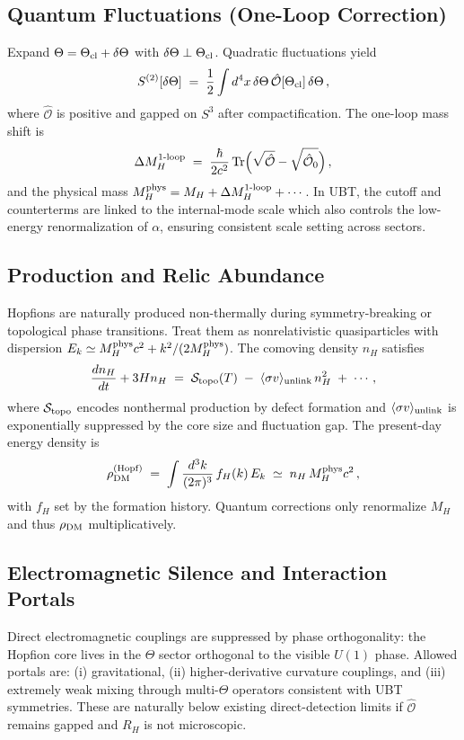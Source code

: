 \documentclass[12pt,a4paper]{article}
\begin{document}
\subsection{Quantum Fluctuations (One-Loop Correction)}
Expand $\Theta=\Theta_{\rm cl}+\delta\Theta$ with $\delta\Theta\perp \Theta_{\rm cl}$. Quadratic fluctuations yield
\begin{equation}
S^{(2)}[\delta\Theta] \;=\; \frac{1}{2}\int d^4x\, \delta\Theta\,\hat{\mathcal{O}}[\Theta_{\rm cl}]\,\delta\Theta\,,
\end{equation}
where $\hat{\mathcal{O}}$ is positive and gapped on $S^3$ after compactification.
The one-loop mass shift is
\begin{equation}
\Delta M_{H}^{\rm 1\text{-}loop} \;=\; \frac{\hbar}{2c^2}\,\mathrm{Tr}\Big(\sqrt{\hat{\mathcal{O}}}-\sqrt{\hat{\mathcal{O}}_0}\Big)\,,
\end{equation}
and the physical mass $M_H^{\rm phys}=M_H+\Delta M_H^{\rm 1\text{-}loop}+\cdots$.
In UBT, the cutoff and counterterms are linked to the internal-mode scale which also controls the low-energy renormalization of $\alpha$,
ensuring consistent scale setting across sectors.

\subsection{Production and Relic Abundance}
Hopfions are naturally produced non-thermally during symmetry-breaking or topological phase transitions.
Treat them as nonrelativistic quasiparticles with dispersion $E_k\simeq M_H^{\rm phys}c^2 + k^2/(2M_H^{\rm phys})$.
The comoving density $n_H$ satisfies
\begin{equation}
\frac{dn_H}{dt}+3H n_H \;=\; \mathcal{S}_{\rm topo}(T)\;-\;\langle\sigma v\rangle_{\rm unlink}\, n_H^2 \;+\; \cdots,
\end{equation}
where $\mathcal{S}_{\rm topo}$ encodes nonthermal production by defect formation and $\langle\sigma v\rangle_{\rm unlink}$ is exponentially suppressed by the core size and fluctuation gap.
The present-day energy density is
\begin{equation}
\rho_{\rm DM}^{\rm (Hopf)} \;=\; \int \frac{d^3k}{(2\pi)^3}\, f_H(k)\, E_k
\;\simeq\; n_H\, M_H^{\rm phys}c^2\,,
\end{equation}
with $f_H$ set by the formation history. Quantum corrections only renormalize $M_H$ and thus $\rho_{\rm DM}$ multiplicatively.

\subsection{Electromagnetic Silence and Interaction Portals}
Direct electromagnetic couplings are suppressed by phase orthogonality: the Hopfion core lives in the $\Theta$ sector orthogonal to the visible $U(1)$ phase.
Allowed portals are: (i) gravitational, (ii) higher-derivative curvature couplings, and (iii) extremely weak mixing through multi-$\Theta$ operators consistent with UBT symmetries.
These are naturally below existing direct-detection limits if $\hat{\mathcal{O}}$ remains gapped and $R_H$ is not microscopic.
\end{document}
